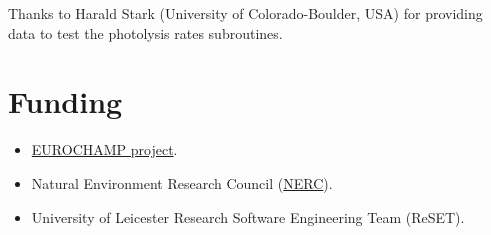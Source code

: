 Thanks to Harald Stark (University of Colorado-Boulder, USA) for
providing data to test the photolysis rates subroutines.

\section{Funding} \label{sec:funding}

\begin{itemize}
\item \href{https://www.eurochamp.org/}{EUROCHAMP project}.
\item Natural Environment Research Council
  (\href{https://www.nerc.ac.uk/}{NERC}).
\item University of Leicester Research Software Engineering Team (ReSET).
\end{itemize}
